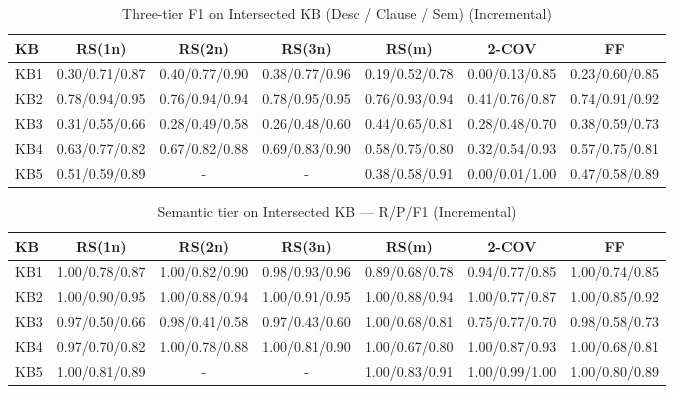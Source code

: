\begin{table}[htbp]
\centering
\caption{Three-tier F1 on Intersected KB (Desc / Clause / Sem) (Incremental)}
\label{tab:three_tier_f1_incremental}
\begin{tabular}{lcccccc}
\toprule
KB & RS(1n) & RS(2n) & RS(3n) & RS(m) & 2-COV & FF \\
\midrule
KB1 & 0.30/0.71/0.87 & 0.40/0.77/0.90 & 0.38/0.77/0.96 & 0.19/0.52/0.78 & 0.00/0.13/0.85 & 0.23/0.60/0.85 \\
KB2 & 0.78/0.94/0.95 & 0.76/0.94/0.94 & 0.78/0.95/0.95 & 0.76/0.93/0.94 & 0.41/0.76/0.87 & 0.74/0.91/0.92 \\
KB3 & 0.31/0.55/0.66 & 0.28/0.49/0.58 & 0.26/0.48/0.60 & 0.44/0.65/0.81 & 0.28/0.48/0.70 & 0.38/0.59/0.73 \\
KB4 & 0.63/0.77/0.82 & 0.67/0.82/0.88 & 0.69/0.83/0.90 & 0.58/0.75/0.80 & 0.32/0.54/0.93 & 0.57/0.75/0.81 \\
KB5 & 0.51/0.59/0.89 & - & - & 0.38/0.58/0.91 & 0.00/0.01/1.00 & 0.47/0.58/0.89 \\
\bottomrule
\end{tabular}
\end{table}

\begin{table}[htbp]
\centering
\caption{Semantic tier on Intersected KB — R/P/F1 (Incremental)}
\label{tab:semantic_prf_incremental}
\begin{tabular}{lcccccc}
\toprule
KB & RS(1n) & RS(2n) & RS(3n) & RS(m) & 2-COV & FF \\
\midrule
KB1 & 1.00/0.78/0.87 & 1.00/0.82/0.90 & 0.98/0.93/0.96 & 0.89/0.68/0.78 & 0.94/0.77/0.85 & 1.00/0.74/0.85 \\
KB2 & 1.00/0.90/0.95 & 1.00/0.88/0.94 & 1.00/0.91/0.95 & 1.00/0.88/0.94 & 1.00/0.77/0.87 & 1.00/0.85/0.92 \\
KB3 & 0.97/0.50/0.66 & 0.98/0.41/0.58 & 0.97/0.43/0.60 & 1.00/0.68/0.81 & 0.75/0.77/0.70 & 0.98/0.58/0.73 \\
KB4 & 0.97/0.70/0.82 & 1.00/0.78/0.88 & 1.00/0.81/0.90 & 1.00/0.67/0.80 & 1.00/0.87/0.93 & 1.00/0.68/0.81 \\
KB5 & 1.00/0.81/0.89 & - & - & 1.00/0.83/0.91 & 1.00/0.99/1.00 & 1.00/0.80/0.89 \\
\bottomrule
\end{tabular}
\end{table}

